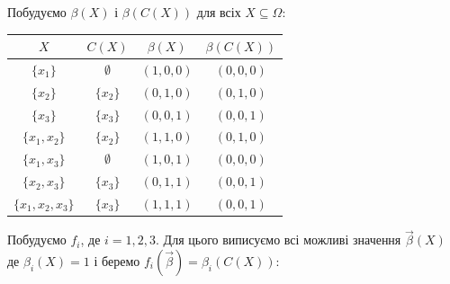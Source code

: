 \begin{solution}
    Побудуємо $\beta(X)$ і $\beta(C(X))$ для всіх $X \subseteq \Omega$:

    \begin{table}[H]
        \centering
        \begin{tabular}{|c|c|c|c|}
            \hline 
            $X$ & $C(X)$ & $\beta(X)$ & $\beta(C(X))$ \\ \hline
            $\{x_1\}$ & $\emptyset$ & $(1, 0, 0)$ & $(0, 0, 0)$ \\
            $\{x_2\}$ & $\{x_2\}$ & $(0, 1, 0)$ & $(0, 1, 0)$ \\
            $\{x_3\}$ & $\{x_3\}$ & $(0, 0, 1)$ & $(0, 0, 1)$ \\
            $\{x_1, x_2\}$ & $\{x_2\}$ & $(1, 1, 0)$ & $(0, 1, 0)$ \\
            $\{x_1, x_3\}$ & $\emptyset$ & $(1, 0, 1)$ & $(0, 0, 0)$ \\
            $\{x_2, x_3\}$ & $\{x_3\}$ & $(0, 1, 1)$ & $(0, 0, 1)$ \\
            $\{x_1, x_2, x_3\}$ & $\{x_3\}$ & $(1, 1, 1)$ & $(0, 0, 1)$ \\ \hline
        \end{tabular}
    \end{table}
    
    Побудуємо $f_i$, де $i = 1, 2, 3$. Для цього виписуємо всі можливі значення $\vec \beta(X)$ де $\beta_i(X) = 1$ і беремо $f_i(\vec \beta) = \beta_i(C(X))$:
    

\end{solution}
